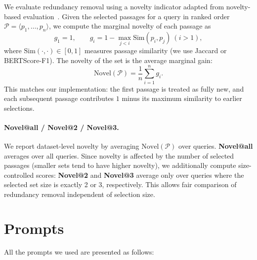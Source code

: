 \documentclass[11pt]{article}
\begin{document}
We evaluate redundancy removal using a novelty indicator adapted from novelty-based evaluation~\citep{clarke2008novelty,tsai2010evaluation}. 
Given the selected passages for a query in ranked order $\mathcal{P}=\langle p_1,\ldots,p_n\rangle$, we compute the marginal novelty of each passage as
\begin{equation}
g_1=1,\qquad 
g_i = 1-\max_{j<i}\mathrm{Sim}(p_i,p_j)\ (i\!>\!1),
\end{equation}
where $\mathrm{Sim}(\cdot,\cdot)\in[0,1]$ measures passage similarity (we use Jaccard or BERTScore-F1).
The novelty of the set is the average marginal gain:
\begin{equation}
\mathrm{Novel}(\mathcal{P})=\frac{1}{n}\sum_{i=1}^{n} g_i .
\end{equation}
This matches our implementation: the first passage is treated as fully new, and each subsequent passage contributes $1$ minus its maximum similarity to earlier selections.

\paragraph{Novel@all / Novel@2 / Novel@3.}
We report dataset-level novelty by averaging $\mathrm{Novel}(\mathcal{P})$ over queries. 
\textbf{Novel@all} averages over all queries. Since novelty is affected by the number of selected passages (smaller sets tend to have higher novelty), we additionally compute size-controlled scores: \textbf{Novel@2} and \textbf{Novel@3} average only over queries where the selected set size is exactly 2 or 3, respectively. 
This allows fair comparison of redundancy removal independent of selection size.




\section{Prompts}
\label{sec:appendix-prompts}
All the prompts we used are presented as follows:
\end{document}
